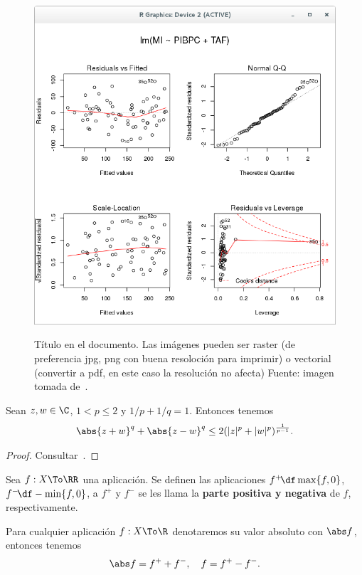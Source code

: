 \begin{figure}[ht]
\centering
\label{fig:analisisGraficoModelo3}
\includegraphics[width=0.9\linewidth]{analisisGraficoModelo3}\\
\caption[Titulo en el índice de figuras (opcional)]{Título en el 
documento. Las imágenes pueden ser raster (de preferencia jpg, png 
con buena resoloción para imprimir) o vectorial (convertir a pdf, en 
este caso la resolución no afecta) Fuente: imagen tomada de~\cite{liu}.}
\end{figure}


\begin{lem}\label{lmcp11}Sean $z,w \in \C$, $1 < p \leq 2$ y $1/p +
1/q = 1$. Entonces tenemos \[\abs{z+w}^q + \abs{z-w}^q \leq 2 (|z|^p
+ |w|^p)^{\frac{1}{p-1}}.\]
\end{lem}

\begin{proof} Consultar~\cite[p. 227]{Hewit}. \end{proof}

\begin{defn}\label{dfcp5}Sea $f:X\To \RR$ una aplicación. Se definen
las aplicaciones $f^+\!\df\max\{f,0\}$, $f^-\!\df-\min\{f,0\}$, a
$f^+$ y $f^-$ se les llama la \textbf{parte positiva y negativa} de
$f$, respectivamente.
\end{defn}


\begin{prp}\label{prcp2}Para cualquier aplicación $f:X\To \R$
denotaremos su valor absoluto con $\abs f$, entonces tenemos
\[\abs f=f^++f^-,\quad f=f^+-f^-.\]
\end{prp}

